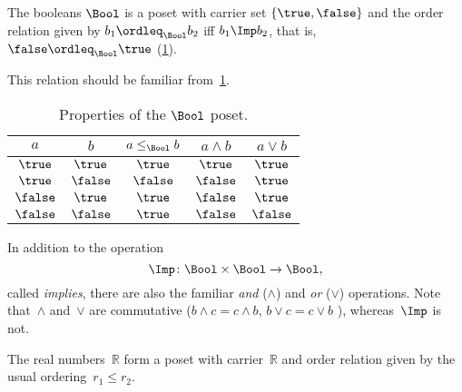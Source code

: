 \begin{example}[Booleans]\label{ex:bool}
The booleans $\Bool$ is a poset with carrier set $\{\true,\false\}$ and the order relation given by $b_1 \ordleq_\Bool b_2$ iff $b_1 \Imp b_2$, that is, $\false \ordleq_\Bool \true$ (\cref{fig:boolean}).

\begin{figure}[h!]
   \centering
   \caption{\label{fig:boolean}}
\end{figure}

This relation should be familiar from~\cref{tab:boolposet}.

\begin{table}[h!]
\begin{center}
\begin{tabular}{cc|ccc}
$a$ & $b$ & $a \leq_\Bool b$ & $a \wedge b$ & $a \vee b$ \\ \hline
$\true$&$\true$&$\true$&$\true$&$\true$\\
$\true$&$\false$&$\false$&$\false$&$\true$\\
$\false$&$\true$&$\true$&$\false$&$\true$\\
$\false$&$\false$&$\true$&$\false$&$\false$
\end{tabular}
\end{center}
\caption{Properties of the $\Bool$ poset. \label{tab:boolposet}}
\end{table}

In addition to the operation 
\begin{equation*}
    \Imp\colon\Bool\times \Bool\to\Bool,
\end{equation*}
called \emph{implies}, there are also the familiar \emph{and} ($\wedge$) and \emph{or} ($\vee$) operations. Note that~$\wedge$ and~$\vee$ are commutative ($b\wedge c = c\wedge b$, $b\vee c = c\vee b$ ), whereas~$\Imp$ is not.
\end{example}




\begin{example}[Reals]
The real numbers~$\mathbb{R}$ form a poset with carrier~$\mathbb{R}$ and order relation given by the usual ordering~$r_1 \leq r_2$.
\end{example}

